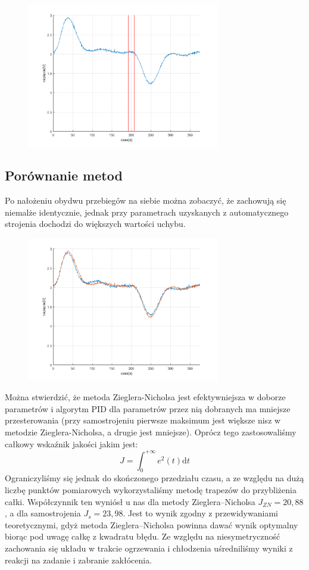 \documentclass[a4paper, 12pt]{article}
\begin{document}
			\begin{figure}[H]
				\centering
				\includegraphics[width=0.75\textwidth]{./img/auto.png}
			\end{figure}
		\subsection{Porównanie metod}
			Po nałożeniu obydwu przebiegów na siebie można zobaczyć, że zachowują się niemalże identycznie, jednak przy parametrach uzyskanych z automatycznego strojenia dochodzi do większych wartości uchybu.
			\begin{figure}[H]
				\centering
				\includegraphics[width=0.75\textwidth]{./img/comparision.png}
			\end{figure}
			Można stwierdzić, że metoda Zieglera-Nicholsa jest efektywniejsza w doborze parametrów i algorytm PID dla parametrów przez nią dobranych ma mniejsze przesterowania (przy samostrojeniu pierwsze maksimum jest większe nisz w metodzie Zieglera-Nicholsa, a drugie jest mniejsze). Oprócz tego zastosowaliśmy całkowy wskaźnik jakości jakim jest:
			$$
				J = \int_{0}^{+\infty} e^2(t) \mathrm{d}t
			$$
			Ograniczyliśmy się jednak do skończonego przedziału czasu, a ze względu na dużą liczbę punktów pomiarowych wykorzystaliśmy metodę trapezów do przybliżenia całki. Współczynnik ten wyniósł u nas dla metody Zieglera--Nicholsa $J_{ZN} = 20,88$, a dla samostrojenia $J_s = 23,98$. Jest to wynik zgodny z przewidywaniami teoretycznymi, gdyż metoda Zieglera--Nicholsa powinna dawać wynik optymalny biorąc pod uwagę całkę z kwadratu błędu. Ze względu na niesymetryczność zachowania się układu w trakcie ogrzewania i chłodzenia uśredniliśmy wyniki z reakcji na zadanie i zabranie zakłócenia.
\end{document}
